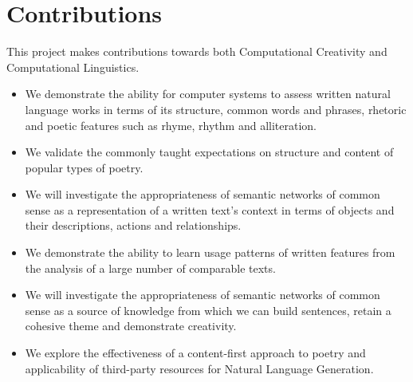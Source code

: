 \section{Contributions}
This project makes contributions towards both Computational Creativity and Computational Linguistics.
\begin{itemize}
\item{We demonstrate the ability for computer systems to assess written natural language works in terms of its structure, common words and phrases, rhetoric and poetic features such as rhyme, rhythm and alliteration.}
\item{We validate the commonly taught expectations on structure and content of popular types of poetry.}
\item{We will investigate the appropriateness of semantic networks of common sense as a representation of a written text's context in terms of objects and their descriptions, actions and relationships.}
\item {We demonstrate the ability to learn usage patterns of written features from the analysis of a large number of comparable texts.}
\item{We will investigate the appropriateness of semantic networks of common sense as a source of knowledge from which we can build sentences, retain a cohesive theme and demonstrate creativity.}
\item{We explore the effectiveness of a content-first approach to poetry and applicability of third-party resources for Natural Language Generation.}
\end{itemize}


